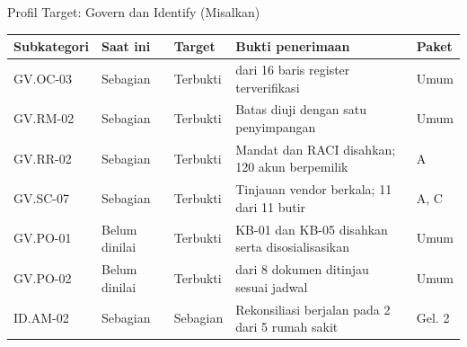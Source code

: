 \documentclass[aspectratio=169, table, 12pt]{beamer}
\begin{document}
\begin{frame}{{\Large Profil Target: Govern dan Identify (Misalkan)}}
  \vspace{2pt}
  \scriptsize
  \begin{tabularx}{\textwidth}{|>{\raggedright\arraybackslash}p{}|>{\raggedright\arraybackslash}p{}|>{\raggedright\arraybackslash}p{}|>{\raggedright\arraybackslash}X|>{\raggedright\arraybackslash}p{}|}
    \hline
    \textbf{Subkategori} & \textbf{Saat ini} & \textbf{Target} & \textbf{Bukti penerimaan} &
    \textbf{Paket} \\ \hline
    GV.OC-03 & Sebagian & Terbukti & 16 dari 16 baris register terverifikasi & Umum \\ \hline
    GV.RM-02 & Sebagian & Terbukti & Batas diuji dengan satu penyimpangan & Umum \\ \hline
    GV.RR-02 & Sebagian & Terbukti & Mandat dan RACI disahkan; 120 akun berpemilik & A \\ \hline
    GV.SC-07 & Sebagian & Terbukti & Tinjauan vendor berkala; 11 dari 11 butir & A, C \\ \hline
    GV.PO-01 & Belum dinilai & Terbukti & KB-01 dan KB-05 disahkan serta disosialisasikan & Umum \\
    \hline
    GV.PO-02 & Belum dinilai & Terbukti & 8 dari 8 dokumen ditinjau sesuai jadwal & Umum \\ \hline
    ID.AM-02 & Sebagian & Sebagian & Rekonsiliasi berjalan pada 2 dari 5 rumah sakit & Gel. 2 \\
    \hline
  \end{tabularx}
\end{frame}
\end{document}
